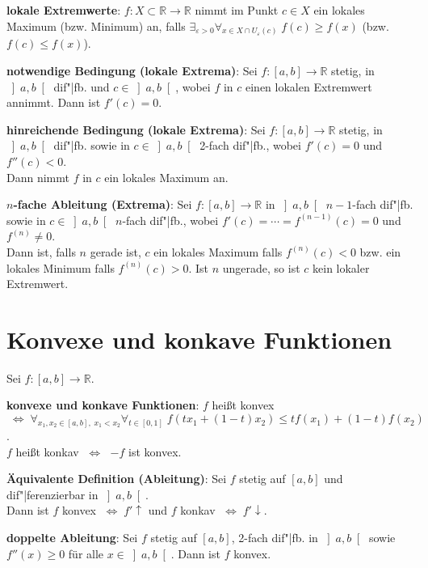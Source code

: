 \textbf{lokale Extremwerte}:
$f: X \subset \mathbb{R} \rightarrow \mathbb{R}$ nimmt im Punkt $c \in X$
ein lokales Maximum (bzw. Minimum) an, falls
$\exists_{\varepsilon > 0} \forall_{x \in X \cap U_\varepsilon(c)}\;
f(c) \ge f(x)$ (bzw. $f(c) \le f(x)$).

\textbf{notwendige Bedingung (lokale Extrema)}:
Sei $f: [a,b] \rightarrow \mathbb{R}$ stetig, in $\left]a,b\right[$ dif"|fb.
und $c \in \left]a,b\right[$, wobei $f$ in $c$ einen lokalen Extremwert
annimmt. \qquad
Dann ist $f'(c) = 0$.

\textbf{hinreichende Bedingung (lokale Extrema)}:
Sei $f: [a,b] \rightarrow \mathbb{R}$ stetig, in $\left]a,b\right[$ dif"|fb.
sowie in $c \in \left]a,b\right[$ 2-fach dif"|fb., wobei
$f'(c) = 0$ und $f''(c) < 0$. \\
Dann nimmt $f$ in $c$ ein lokales Maximum an.

\textbf{$n$-fache Ableitung (Extrema)}:
Sei $f: [a,b] \rightarrow \mathbb{R}$ in $\left]a,b\right[$ $n-1$-fach dif"|fb.
sowie in $c \in \left]a,b\right[$ $n$-fach dif"|fb., wobei
$f'(c) = \cdots = f^{(n-1)}(c) = 0$ und $f^{(n)} \not= 0$. \\
Dann ist, falls $n$ gerade ist, $c$ ein lokales Maximum falls $f^{(n)}(c) < 0$
bzw. ein lokales Minimum falls $f^{(n)}(c) > 0$. \qquad
Ist $n$ ungerade, so ist $c$ kein lokaler Extremwert.

\section{%
    Konvexe und konkave Funktionen%
}

Sei $f: [a,b] \rightarrow \mathbb{R}$.

\textbf{konvexe und konkave Funktionen}:
$f$ heißt konvex \\
$\;\Leftrightarrow\; \forall_{x_1, x_2 \in [a,b],\; x_1 < x_2}
\forall_{t \in [0,1]}\; f(tx_1 + (1 - t)x_2) \le t f(x_1) + (1 - t) f(x_2)$. \\
$f$ heißt konkav $\;\Leftrightarrow\;$ $-f$ ist konvex.

\textbf{Äquivalente Definition (Ableitung)}:
Sei $f$ stetig auf $[a,b]$ und dif"|ferenzierbar in $\left]a,b\right[$. \\
Dann ist $f$ konvex $\;\Leftrightarrow\; f'\!\!\uparrow$ \qquad und \qquad
$f$ konkav $\;\Leftrightarrow\; f'\!\!\downarrow$.

\textbf{doppelte Ableitung}:
Sei $f$ stetig auf $[a,b]$, 2-fach dif"|fb. in $\left]a,b\right[$ sowie
$f''(x) \ge 0$ für alle $x \in \left]a,b\right[$. \qquad
Dann ist $f$ konvex.

